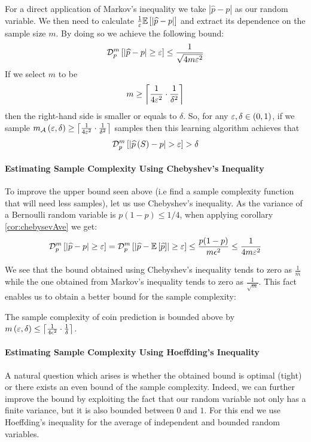 For a direct application of Markov's inequality we take  $|\widehat{p}-p|$ as our random variable. We then need to calculate $\frac{1}{\varepsilon}\mathbb{E}\left[\left|\widehat{p}-p\right|\right]$ and extract its dependence on the sample size $m$. By doing so we achieve the following bound:
$$
\mathcal{D}_p ^m \left[\left|\widehat{p}-p\right| \geq \varepsilon \right]  \le \frac{1}{\sqrt{4m\varepsilon^2}}
$$
If we select $m$ to be $$m\ge  \left \lceil \frac{1}{4\varepsilon^2} \cdot \frac{1}{\delta^2} \right \rceil $$
then the right-hand side is smaller or equals to $\delta$. So, for any $\varepsilon,\delta\in\left(0,1\right)$, if we sample $m_{\mathcal{A}}\left(\varepsilon,\delta\right)\geq \left \lceil \frac{1}{4\varepsilon^2} \cdot \frac{1}{\delta^2} \right \rceil $ samples then this learning algorithm achieves that $$ \mathcal{D} ^{m}_p \left[ \left|\widehat{p}\left(S\right)-p\right| >  \varepsilon \right] > \delta$$ 


\paragraph{Estimating Sample Complexity Using Chebyshev's Inequality}
To improve the upper bound seen above (i.e find a sample complexity function that will need less samples), let us use Chebyshev's inequality. As the variance of a Bernoulli random variable is $p\left(1-p\right) \le 1/4$, when applying corollary \ref{cor:chebysevAve} we get:
$$ \mathcal{D}_p ^m \left[\left|\widehat{p}-p\right| \ge \varepsilon\right] = \mathcal{D}_p ^m\left[\left|\widehat{p}-\mathbb{E}\left[\widehat{p}\right]\right| \ge \varepsilon\right] \le \frac{p(1-p)}{m\epsilon^2} \le \frac{1}{4m \varepsilon ^2}$$

We see that the bound obtained using Chebyshev's inequality tends to zero as $\frac{1}{m}$ while the one obtained from Markov's inequality tends to zero as $\frac{1}{\sqrt{m}}$.
This fact enables us to obtain a better bound for the sample complexity:

\begin{corollary}  \label{cor:basicConcentration}
The sample complexity of coin prediction is bounded above by $m\left(\varepsilon,\delta\right) \le \left \lceil \frac{1}{4\epsilon^2} \cdot \frac{1}{\delta} \right \rceil$.
\end{corollary}


\paragraph{Estimating Sample Complexity Using Hoeffding's Inequality}
A natural question which arises is whether the obtained bound is optimal (tight) or there exists an even bound of the sample complexity. 
Indeed, we can further improve the bound by exploiting the fact that our random variable not only has a finite variance, but it is also bounded between $0$ and $1$. For this end we use Hoeffding's inequality for the average of independent and bounded random variables. 

